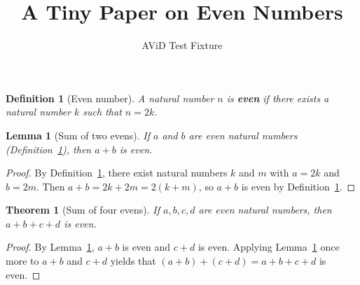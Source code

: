 \documentclass{article}
\title{A Tiny Paper on Even Numbers}
\author{AViD Test Fixture}
\newtheorem{theorem}{Theorem}
\newtheorem{lemma}{Lemma}
\newtheorem{definition}{Definition}
\begin{document}
\maketitle

\begin{definition}[Even number]\label{def:even}
A natural number $n$ is \textbf{even} if there exists a natural number $k$
such that $n = 2k$.
\end{definition}

\begin{lemma}[Sum of two evens]\label{lem:even_sum}
If $a$ and $b$ are even natural numbers (Definition~\ref{def:even}),
then $a + b$ is even.
\end{lemma}

\begin{proof}
By Definition~\ref{def:even}, there exist natural numbers $k$ and $m$
with $a = 2k$ and $b = 2m$. Then $a + b = 2k + 2m = 2(k + m)$, so
$a + b$ is even by Definition~\ref{def:even}.
\end{proof}

\begin{theorem}[Sum of four evens]\label{thm:four_evens}
If $a, b, c, d$ are even natural numbers, then $a + b + c + d$ is even.
\end{theorem}

\begin{proof}
By Lemma~\ref{lem:even_sum}, $a + b$ is even and $c + d$ is even.
Applying Lemma~\ref{lem:even_sum} once more to $a + b$ and $c + d$
yields that $(a + b) + (c + d) = a + b + c + d$ is even.
\end{proof}
\end{document}

